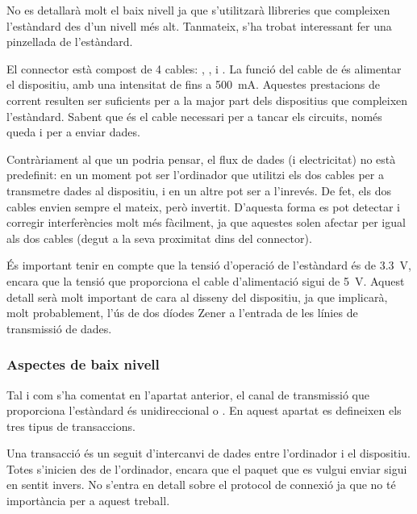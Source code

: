 No es detallarà molt el baix nivell ja que s'utilitzarà llibreries que
compleixen l'estàndard des d'un nivell més alt. Tanmateix, s'ha trobat
interessant fer una pinzellada de l'estàndard.

El connector  està compost de 4 cables: , ,
 i . La funció del cable de  és alimentar el
dispositiu, amb una intensitat de fins a
\SI[round-mode=places,round-precision=0]{500}{\milli\ampere}. Aquestes
prestacions de corrent resulten ser suficients per a la major part dels
dispositius que compleixen l'estàndard. Sabent que  és el cable
necessari per a tancar els circuits, només queda  i  per
a enviar dades.

Contràriament al que un podria pensar, el flux de dades (i electricitat) no
està predefinit: en un moment pot ser l'ordinador que utilitzi els dos cables
per a transmetre dades al dispositiu, i en un altre pot ser a l'inrevés. De fet,
els dos cables envien sempre el mateix, però invertit. D'aquesta forma es pot
detectar i corregir interferències molt més fàcilment, ja que aquestes solen
afectar per igual als dos cables (degut a la seva proximitat dins del
connector).

És important tenir en compte que la tensió d'operació de l'estàndard 
és de
\SI[round-mode=places,round-precision=1]{3.3}{\volt}, encara que la tensió que
proporciona el cable
d'alimentació sigui de
\SI[round-mode=places,round-precision=0]{5}{\volt}.
Aquest detall serà molt important de cara
al disseny del dispositiu, ja que implicarà, molt probablement, l'ús de dos
díodes Zener a l'entrada de les línies de transmissió de dades.

\subsubsection*{Aspectes de baix nivell}

Tal i com s'ha comentat en l'apartat anterior, el canal de transmissió que
proporciona l'estàndard és unidireccional o . En aquest
apartat es defineixen els tres tipus de transaccions.

Una transacció és un seguit d'intercanvi de dades entre l'ordinador i el
dispositiu. Totes s'inicien des de l'ordinador, encara que el paquet que es
vulgui enviar sigui en sentit invers. No s'entra en detall sobre el protocol
de connexió ja que no té importància per a aquest treball.

